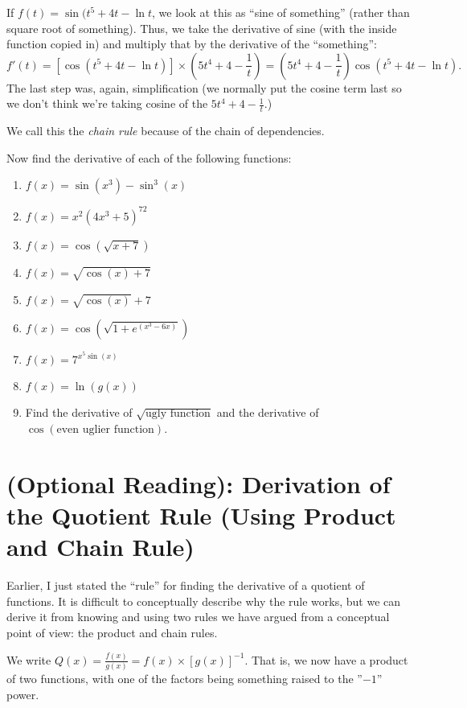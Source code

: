 \documentclass{ximera}
\begin{document}
If  $f(t) = \sin(t^5+4t-\ln t$, we look at this as ``sine of something'' (rather than square root of something).  Thus, we take the derivative of sine (with the inside function copied in) and multiply that by the derivative of the ``something'':
\[
f'(t) = [\cos(t^5+4t-\ln t)] \times \left (5t^4+4-\frac{1}{t} \right) = \left (5t^4+4-\frac{1}{t} \right)\cos(t^5+4t-\ln t).
\]
The last step was, again, simplification (we normally put the cosine term last so we don't think we're taking cosine of the  $5t^4+4-\frac{1}{t}$.)


     We call this the {\em chain rule} because of the chain of dependencies.


\begin{exercise}
Now find the derivative of each of the following functions:
\begin{enumerate}
    \item $f(x) = \sin(x^3) - \sin^3(x)$
    \item $f(x) = x^2(4x^3+5)^{72}$
    \item $f(x) = \cos(\sqrt{x+7})$
    \item $f(x) = \sqrt{\cos(x) +7}$
    \item $f(x) = \sqrt{\cos(x)} + 7$
    \item $f(x) = \cos \left ( \sqrt{1+e^{(x^3-6x)}}\right )$
    \item $f(x) = 7^{x^5\sin(x)}$
    \item $f(x) = \ln(g(x))$
    \item Find the derivative of $\sqrt{\text{ugly function}}$ and the derivative of \\ $\cos(\text{even uglier function})$.
\end{enumerate}
\end{exercise}
 
\section*{(Optional Reading): Derivation of the Quotient Rule (Using Product and Chain Rule)}

Earlier, I just stated the ``rule'' for finding the derivative of a quotient of functions.  It is difficult to conceptually describe why the rule works, but we can derive it from knowing and using two rules we have argued from a conceptual point of view:  the product and chain rules.

We write  $Q(x) = \frac{f(x)}{g(x)} = f(x) \times [g(x)]^{-1}$.  That is, we now have a product of two functions, with one of the factors being something raised to the ''$-1$'' power.
\end{document}
